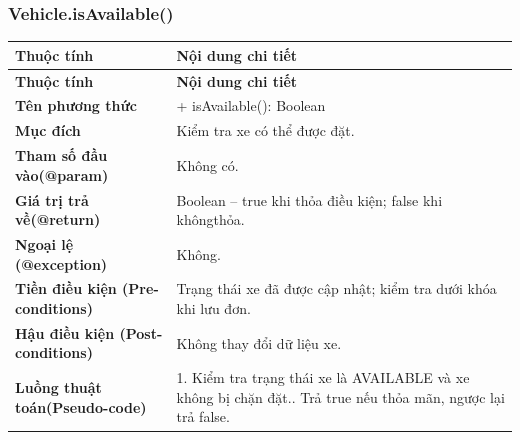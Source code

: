 \subsubsection{Vehicle.isAvailable()}
\begin{longtable}{|L{0.24\textwidth}|L{0.70\textwidth}|}
\hline
\textbf{Thuộc tính} & \textbf{Nội dung chi tiết} \\
\hline
\endfirsthead
\hline
\textbf{Thuộc tính} & \textbf{Nội dung chi tiết} \\
\hline
\endhead
\textbf{Tên phương thức} & + isAvailable(): Boolean \\
\hline
\textbf{Mục đích} & Kiểm tra xe có thể được đặt. \\
\hline
\textbf{Tham số đầu vào}\newline \textbf{(@param)} & Không có. \\
\hline
\textbf{Giá trị trả về(@return)} & Boolean – true khi thỏa điều kiện; false khi khôngthỏa. \\
\hline
\textbf{Ngoại lệ (@exception)} & Không. \\
\hline
\textbf{Tiền điều kiện (Pre-}\newline \textbf{conditions)} & Trạng thái xe đã được cập nhật; kiểm tra dưới khóa khi lưu đơn. \\
\hline
\textbf{Hậu điều kiện (Post-}\newline \textbf{conditions)} & Không thay đổi dữ liệu xe. \\
\hline
\textbf{Luồng thuật toán}\newline \textbf{(Pseudo-code)} & 1. Kiểm tra trạng thái xe là AVAILABLE và xe không bị chặn đặt.. Trả true nếu thỏa mãn, ngược lại trả false. \\
\hline
\end{longtable}
\vspace{-0.5\baselineskip}
